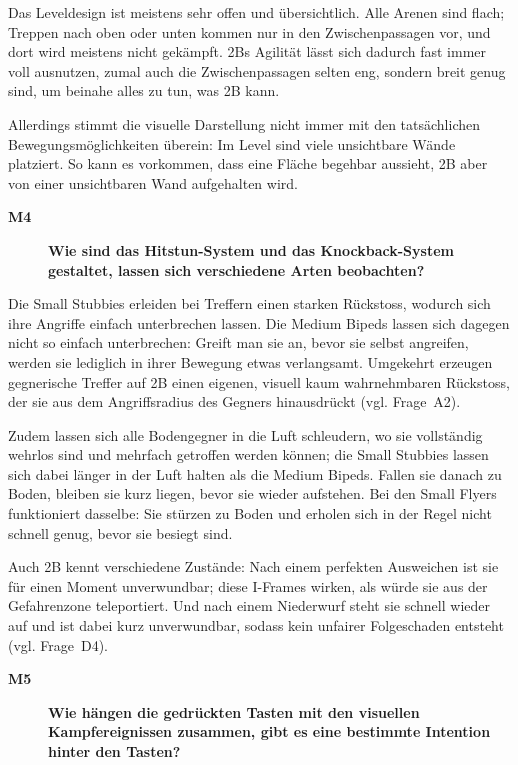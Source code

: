 \documentclass[../Main.tex]{subfiles}
\begin{document}
Das Leveldesign ist meistens sehr offen und übersichtlich. Alle Arenen sind flach; Treppen nach oben oder unten kommen nur in den Zwischenpassagen vor, und dort wird meistens nicht gekämpft. 2Bs Agilität lässt sich dadurch fast immer voll ausnutzen, zumal auch die Zwischenpassagen selten eng, sondern breit genug sind, um beinahe alles zu tun, was 2B kann.

Allerdings stimmt die visuelle Darstellung nicht immer mit den tatsächlichen Bewegungsmöglichkeiten überein: Im Level sind viele unsichtbare Wände platziert. So kann es vorkommen, dass eine Fläche begehbar aussieht, 2B aber von einer unsichtbaren Wand aufgehalten wird.

\begin{description}
  \item[\textbf{M4}] \textbf{Wie sind das Hitstun-System und das Knockback-System gestaltet, lassen sich verschiedene Arten beobachten?}
\end{description}

Die Small Stubbies erleiden bei Treffern einen starken Rückstoss, wodurch sich ihre Angriffe einfach unterbrechen lassen. Die Medium Bipeds lassen sich dagegen nicht so einfach unterbrechen: Greift man sie an, bevor sie selbst angreifen, werden sie lediglich in ihrer Bewegung etwas verlangsamt. Umgekehrt erzeugen gegnerische Treffer auf 2B einen eigenen, visuell kaum wahrnehmbaren Rückstoss, der sie aus dem Angriffsradius des Gegners hinausdrückt (vgl. Frage~A2).

Zudem lassen sich alle Bodengegner in die Luft schleudern, wo sie vollständig wehrlos sind und mehrfach getroffen werden können; die Small Stubbies lassen sich dabei länger in der Luft halten als die Medium Bipeds. Fallen sie danach zu Boden, bleiben sie kurz liegen, bevor sie wieder aufstehen. Bei den Small Flyers funktioniert dasselbe: Sie stürzen zu Boden und erholen sich in der Regel nicht schnell genug, bevor sie besiegt sind.

Auch 2B kennt verschiedene Zustände: Nach einem perfekten Ausweichen ist sie für einen Moment unverwundbar; diese I-Frames wirken, als würde sie aus der Gefahrenzone teleportiert. Und nach einem Niederwurf steht sie schnell wieder auf und ist dabei kurz unverwundbar, sodass kein unfairer Folgeschaden entsteht (vgl. Frage~D4).

\begin{description}
  \item[\textbf{M5}] \textbf{Wie hängen die gedrückten Tasten mit den visuellen Kampfereignissen zusammen, gibt es eine bestimmte Intention hinter den Tasten?}
\end{description}
\end{document}
